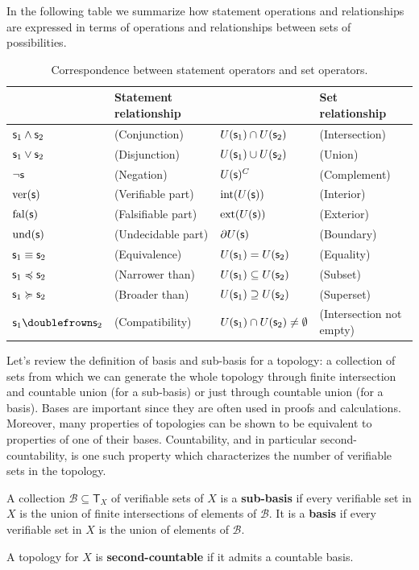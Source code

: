 \documentclass[11pt,letterpaper,fleqn]{memoir} %
\begin{document}
In the following table we summarize how statement operations and relationships are expressed in terms of operations and relationships between sets of possibilities.

\begin{table}[h]
	\centering
	\begin{tabular}{p{} p{} p{} p{}}
		& Statement relationship & & Set relationship  \\ 
		\hline 
		$\mathsf{s}_1 \wedge \mathsf{s}_2$ & (Conjunction) & $U(\mathsf{s}_1) \cap U(\mathsf{s}_2)$ & (Intersection) \\ 
		$\mathsf{s}_1 \vee \mathsf{s}_2$ & (Disjunction) & $U(\mathsf{s}_1) \cup U(\mathsf{s}_2)$ & (Union) \\ 
		$\neg \mathsf{s}$ & (Negation) & $U(\mathsf{s})^C$ & (Complement) \\ 
		$\operatorname{ver}(\mathsf{s})$ & (Verifiable part) & $\operatorname{int}(U(\mathsf{s}))$ & (Interior) \\ 
		$\operatorname{fal}(\mathsf{s})$ & (Falsifiable part) & $\operatorname{ext}(U(\mathsf{s}))$ & (Exterior) \\ 
		$\operatorname{und}(\mathsf{s})$ & (Undecidable part) & $\partial U(\mathsf{s})$ & (Boundary) \\ 
		$\mathsf{s}_1 \equiv \mathsf{s}_2$ & (Equivalence) & $U(\mathsf{s}_1) = U(\mathsf{s}_2)$ & (Equality) \\ 
		$\mathsf{s}_1 \preccurlyeq \mathsf{s}_2$ & (Narrower than) & $U(\mathsf{s}_1) \subseteq U(\mathsf{s}_2)$ & (Subset) \\ 
		$\mathsf{s}_1 \succcurlyeq \mathsf{s}_2$ & (Broader than) & $U(\mathsf{s}_1) \supseteq U(\mathsf{s}_2)$ & (Superset) \\ 
		$\stmt_1 \comp \stmt_2$ & (Compatibility) & $U(\mathsf{s}_1) \cap U(\mathsf{s}_2) \neq \emptyset$ & (Intersection not empty)
	\end{tabular} 
	\caption{Correspondence between statement operators and set operators.}
\end{table}

Let's review the definition of basis and sub-basis for a topology: a collection of sets from which we can generate the whole topology through finite intersection and countable union (for a sub-basis) or just through countable union (for a basis). Bases are important since they are often used in proofs and calculations. Moreover, many properties of topologies can be shown to be equivalent to properties of one of their bases. Countability, and in particular second-countability, is one such property which characterizes the number of verifiable sets in the topology.

\begin{mathSection}
\begin{defn}
	A collection $\mathcal{B} \subseteq \mathsf{T}_X$ of verifiable sets of $X$ is a \textbf{sub-basis} if every verifiable set in $X$ is the union of finite intersections of elements of $\mathcal{B}$. It is a \textbf{basis} if every verifiable set in $X$ is the union of elements of $\mathcal{B}$.
\end{defn}
\begin{defn}
	A topology for $X$ is \textbf{second-countable} if it admits a countable basis.
\end{defn}
\end{mathSection}
\end{document}
